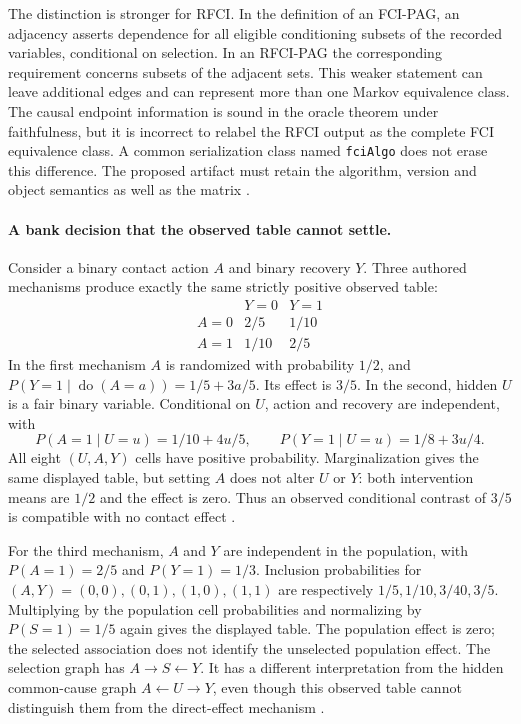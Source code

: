 The distinction is stronger for RFCI. In the definition of an FCI-PAG, an
adjacency asserts dependence for all eligible conditioning subsets of the
recorded variables, conditional on selection. In an RFCI-PAG the corresponding
requirement concerns subsets of the adjacent sets. This weaker statement can
leave additional edges and can represent more than one Markov equivalence
class. The causal endpoint information is sound in the oracle theorem under
faithfulness, but it is incorrect to relabel the RFCI output as the complete
FCI equivalence class. A common serialization class named \texttt{fciAlgo}
does not erase this difference. The proposed artifact must retain the
algorithm, version and object semantics as well as the matrix
\citep{exec13_latentr_colombo2012,exec13_latentr_primary}.

\paragraph{A bank decision that the observed table cannot settle.}
Consider a binary contact action $A$ and binary recovery $Y$. Three authored
mechanisms produce exactly the same strictly positive observed table:
\[
\begin{array}{c|cc}
 &Y=0&Y=1\\\hline
 A=0&2/5&1/10\\
 A=1&1/10&2/5
\end{array}
\]
In the first mechanism $A$ is randomized with probability $1/2$, and
$P(Y=1\mid\operatorname{do}(A=a))=1/5+3a/5$. Its effect is $3/5$.
In the second, hidden $U$ is a fair binary variable. Conditional on $U$,
action and recovery are independent, with
\[
 P(A=1\mid U=u)=1/10+4u/5,\qquad
 P(Y=1\mid U=u)=1/8+3u/4.
\]
All eight $(U,A,Y)$ cells have positive probability. Marginalization gives
the same displayed table, but setting $A$ does not alter $U$ or $Y$: both
intervention means are $1/2$ and the effect is zero. Thus an observed
conditional contrast of $3/5$ is compatible with no contact effect
\citep{exec13_latentr_exact}.

For the third mechanism, $A$ and $Y$ are independent in the population,
with $P(A=1)=2/5$ and $P(Y=1)=1/3$. Inclusion probabilities for
$(A,Y)=(0,0),(0,1),(1,0),(1,1)$ are respectively
$1/5,1/10,3/40,3/5$. Multiplying by the population cell probabilities
and normalizing by $P(S=1)=1/5$ again gives the displayed table.
The population effect is zero; the selected association
does not identify the unselected population effect. The selection graph has
$A\to S\leftarrow Y$. It has a different interpretation from the hidden
common-cause graph $A\leftarrow U\to Y$, even though this observed table
cannot distinguish them from the direct-effect mechanism
\citep{exec13_latentr_exact}.

